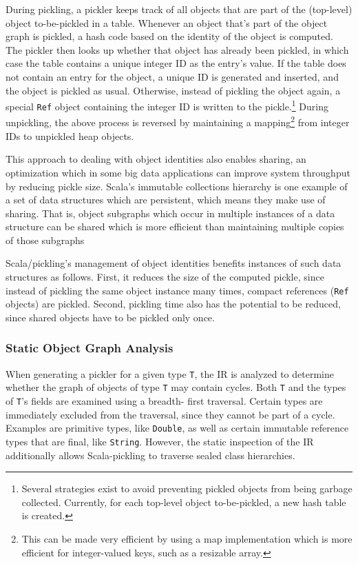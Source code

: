\documentclass[preprint,10pt]{sigplanconf}
\theoremstyle{definition}
\theoremstyle{definition}
\begin{document}
During pickling, a pickler keeps track of all objects that are part of the
(top-level) object to-be-pickled in a table. Whenever an object that's part of
the object graph is pickled, a hash code based on the identity of the object
is computed. The pickler then looks up whether that object has already been
pickled, in which case the table contains a unique integer ID as the entry's
value. If the table does not contain an entry for the object, a unique ID is
generated and inserted, and the object is pickled as usual. Otherwise, instead
of pickling the object again, a special \verb|Ref| object containing the integer ID
is written to the pickle.\footnote{Several strategies exist to avoid preventing pickled objects from being garbage collected. Currently, for each top-level object to-be-pickled, a new hash table is created.}
During unpickling, the above process is reversed by maintaining a
mapping\footnote{This can be made very efficient by using a map implementation which is more efficient for integer-valued keys, such as a resizable array.}
from integer IDs to unpickled heap objects.

This approach to dealing with object identities also enables sharing, an
optimization which in some big data applications can improve system throughput
by reducing pickle size. Scala's immutable collections hierarchy is one
example of a set of data structures which are persistent, which means they
make use of sharing. That is, object subgraphs which occur in multiple
instances of a data structure can be shared which is more efficient than
maintaining multiple copies of those subgraphs

Scala/pickling's management of object identities benefits instances of such
data structures as follows. First, it reduces the size of the computed pickle,
since instead of pickling the same object instance many times, compact
references (\verb|Ref| objects) are pickled. Second, pickling time also has
the potential to be reduced, since shared objects have to be pickled only
once.

\subsubsection{Static Object Graph Analysis}
\label{sec:object-graph-analysis}

When generating a pickler for a given type \verb|T|, the IR is analyzed to
determine whether the graph of objects of type \verb|T| may contain cycles.
Both \verb|T| and the types of \verb|T|'s fields are examined using a breadth-
first traversal. Certain types are immediately excluded from the traversal,
since they cannot be part of a cycle. Examples are primitive types, like
\verb|Double|, as well as certain immutable reference types that are final,
like \verb|String|. However, the static inspection of the IR additionally
allows Scala-pickling to traverse sealed class hierarchies.
\end{document}
